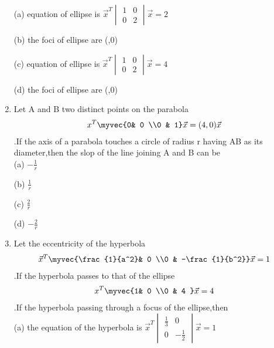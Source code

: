 \begin{enumerate}
    \choice (a) equation of ellipse is $\vec x^T \begin{vmatrix}
    1& 0 \\0 & 2 \end{vmatrix} \vec x=2$
    
    \choice (b) the foci of ellipse are (,0)
    
    \choice (c) equation of ellipse is $\vec x^T \begin{vmatrix}
    1& 0 \\0 & 2 \end{vmatrix} \vec x=4$
    
    \choice (d) the foci of ellipse are (\pm {},0)\\
    
    \item Let A and B two distinct points on the parabola \begin{align} x^T \myvec{0& 0 \\0 & 1} \vec x=(4,0)\vec x\end{align}.If the axis of a parabola touches a circle of radius r having AB as its diameter,then the slop of the line joining A and B can be \\
    
    \choice (a) $-\frac{1}{r}$
    
    \choice (b) $\frac{1}{r}$
    
    \choice (c) $\frac{2}{r}$
    
    \choice (d) $-\frac{2}{r}$\\ 
    
    \item Let the eccentricity of the hyperbola \begin{align}\vec x^T \myvec{\frac{1}{a^2}& 0 \\0 & -\frac{1}{b^2}}\vec x=1\end{align}.If the hyperbola passes to that of the ellipse \begin{align}x^T \myvec{1& 0 \\0 & 4 }\vec x=4\end{align}.If the hyperbola passing through a focus of the ellipse,then\\
    
    \choice (a) the equation of the hyperbola is $\vec x^T \begin{vmatrix}
    \frac{1}{3}& 0 \\0 & -\frac{1}{2} \end{vmatrix} \vec x=1$
    

\end{enumerate}
